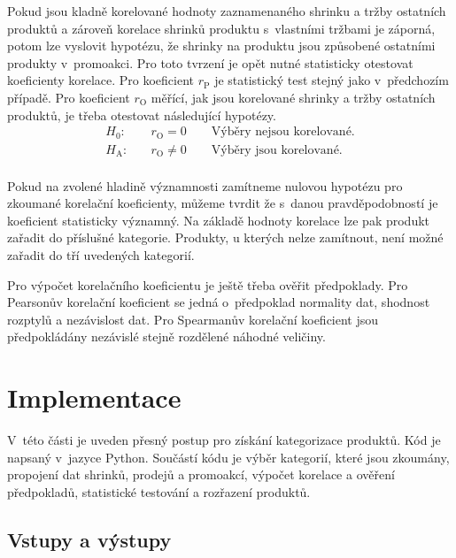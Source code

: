Pokud jsou kladně korelované hodnoty zaznamenaného shrinku a tržby ostatních produktů a zároveň korelace shrinků produktu s~vlastními tržbami je záporná, potom lze vyslovit hypotézu, že shrinky na produktu jsou způsobené ostatními produkty v~promoakci.
Pro toto tvrzení je opět nutné statisticky otestovat koeficienty korelace. Pro koeficient $r_\mathrm{P}$ je statistický test stejný jako v~předchozím případě. Pro koeficient $r_\mathrm{O}$ měřící, jak jsou korelované shrinky a tržby ostatních produktů, je třeba otestovat následující hypotézy.
\begin{equation*}
    \begin{aligned}
        H_\mathrm{0}: \quad & r_\mathrm{O} = 0 \qquad \mbox{Výběry nejsou korelované.}  \\
        H_\mathrm{A}: \quad & r_\mathrm{O} \neq 0 \qquad\mbox{Výběry jsou korelované.}\\
    \end{aligned}
\end{equation*}

Pokud na zvolené hladině významnosti zamítneme nulovou hypotézu pro zkoumané korelační koeficienty, můžeme tvrdit že s~danou pravděpodobností je koeficient statisticky významný. Na základě hodnoty korelace lze pak produkt zařadit do příslušné kategorie. Produkty, u kterých nelze zamítnout, není možné zařadit do tří uvedených kategorií.

Pro výpočet korelačního koeficientu je ještě třeba ověřit předpoklady. Pro Pearsonův korelační koeficient se jedná o~předpoklad normality dat, shodnost rozptylů a nezávislost dat. Pro Spearmanův korelační koeficient jsou předpokládány nezávislé stejně rozdělené náhodné veličiny.

\section{Implementace}

V~této části je uveden přesný postup pro získání kategorizace produktů. Kód je napsaný v~jazyce Python. Součástí kódu je výběr kategorií, které jsou zkoumány, propojení dat shrinků, prodejů a promoakcí, výpočet korelace a ověření předpokladů, statistické testování a rozřazení produktů.


\subsection{Vstupy a výstupy}
\label{ss:vstupyvystupy}

